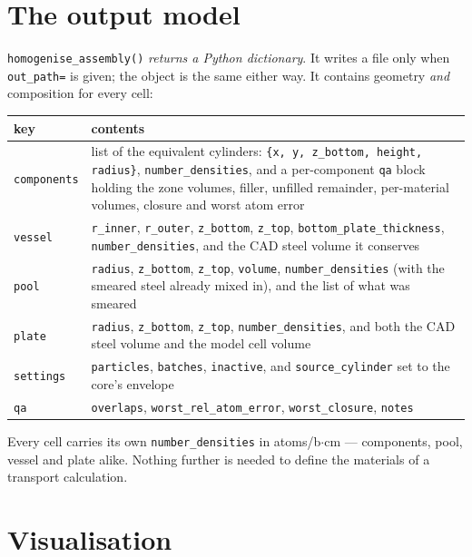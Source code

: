 \documentclass[9pt,a4paper]{extarticle}
\newcommand{\code}[1]{\texttt{\small #1}}
\begin{document}
\section{The output model}

\code{homogenise\_assembly()} \emph{returns a Python dictionary}. It writes a
file only when \code{out\_path=} is given; the object is the same either way. It
contains geometry \emph{and} composition for every cell:

\begin{center}
\begin{tabular}{@{}lp{10.2cm}@{}}
\toprule
key & contents \\
\midrule
\code{components} &
  list of the equivalent cylinders: \code{\{x, y, z\_bottom, height, radius\}},
  \code{number\_densities}, and a per-component \code{qa} block holding the zone
  volumes, filler, unfilled remainder, per-material volumes, closure and worst
  atom error \\
\code{vessel} &
  \code{r\_inner}, \code{r\_outer}, \code{z\_bottom}, \code{z\_top},
  \code{bottom\_plate\_thickness}, \code{number\_densities}, and the CAD steel
  volume it conserves \\
\code{pool} &
  \code{radius}, \code{z\_bottom}, \code{z\_top}, \code{volume},
  \code{number\_densities} (with the smeared steel already mixed in), and the
  list of what was smeared \\
\code{plate} &
  \code{radius}, \code{z\_bottom}, \code{z\_top}, \code{number\_densities}, and
  both the CAD steel volume and the model cell volume \\
\code{settings} &
  \code{particles}, \code{batches}, \code{inactive}, and \code{source\_cylinder}
  set to the core's envelope \\
\code{qa} &
  \code{overlaps}, \code{worst\_rel\_atom\_error}, \code{worst\_closure},
  \code{notes} \\
\bottomrule
\end{tabular}
\end{center}

\noindent
Every cell carries its own \code{number\_densities} in atoms/b$\cdot$cm ---
components, pool, vessel and plate alike. Nothing further is needed to define
the materials of a transport calculation.

\section{Visualisation}
\end{document}
